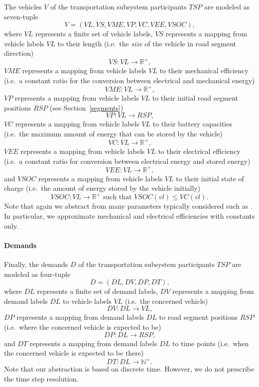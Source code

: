 The vehicles $V$ of the transportation subsystem participants $TSP$ are modeled as seven-tuple
\[
	V = (VL, VS, VME, VP, VC, VEE, VSOC) \textrm{,}
\]
where $VL$ represents a finite set of vehicle labels, $VS$ represents a mapping from vehicle labels $VL$ to their length (i.e.\ the \textit{size} of the vehicle in road segment direction)
\[
	VS : VL \rightarrow \mathbb{R}^+ \textrm{,}
\]
$VME$ represents a mapping from vehicle labels $VL$ to their mechanical efficiency (i.e.\ a constant ratio for the conversion between electrical and mechanical energy)
\[
	VME : VL \rightarrow \mathbb{R}^+ \textrm{,}
\]
$VP$ represents a mapping from vehicle labels $VL$ to their initial road segment positions $RSP$ (see Section~\ref{segments})
\[
	VP : VL \rightarrow RSP \textrm{,}
\]
$VC$ represents a mapping from vehicle labels $VL$ to their battery capacities (i.e.\ the maximum amount of energy that can be stored by the vehicle)
\[
	VC : VL \rightarrow \mathbb{R}^+ \textrm{,}
\]
$VEE$ represents a mapping from vehicle labels $VL$ to their electrical efficiency (i.e.\ a constant ratio for conversion between electrical energy and stored energy)
\[
	VEE : VL \rightarrow \mathbb{R}^+ \textrm{,}
\]
and $VSOC$ represents a mapping from vehicle labels $VL$ to their initial state of charge (i.e.\ the amount of energy stored by the vehicle initially)
\[
	VSOC : VL \rightarrow \mathbb{R}^+ \textrm{ such that } VSOC(vl) \leq VC(vl) \textrm{.}
\]
Note that again we abstract from many parameters typically considered such as . In particular, we approximate mechanical and electrical efficiencies with constants only.

\paragraph{Demands}
\label{demands}

Finally, the demands $D$ of the transportation subsystem participants $TSP$ are modeled as four-tuple
\[
	D = (DL, DV, DP, DT) \textrm{,}
\]
where $DL$ represents a finite set of demand labels, $DV$ represents a mapping from demand labels $DL$ to vehicle labels $VL$ (i.e.\ the concerned vehicle)
\[
	DV: DL \rightarrow VL \textrm{,}
\]
$DP$ represents a mapping from demand labels $DL$ to road segment positions $RSP$ (i.e.\ where the concerned vehicle is expected to be)
\[
	DP: DL \rightarrow RSP \textrm{,}
\]
and $DT$ represents a mapping from demand labels $DL$ to time points (i.e.\ when the concerned vehicle is expected to be there)
\[
	DT: DL \rightarrow \mathbb{N}^+ \textrm{.}
\]
Note that our abstraction is based on discrete time. However, we do not prescribe the time step resolution.

